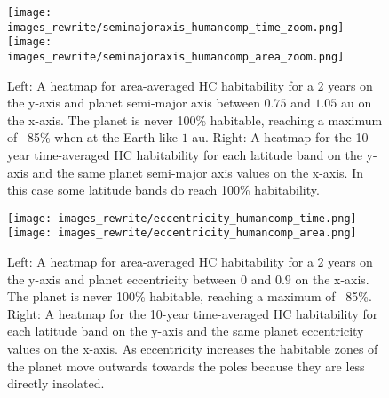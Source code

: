 \documentclass[12pt, onecolumn]{revtex4-2}    %
\begin{document}
\begin{figure}[t]
  \texttt{[image: images\_rewrite/semimajoraxis\_humancomp\_time\_zoom.png]}
  \texttt{[image: images\_rewrite/semimajoraxis\_humancomp\_area\_zoom.png]}
  \caption{
    Left: A heatmap for area-averaged HC habitability for a 2 years on the y-axis and planet semi-major axis between $0.75$ and $1.05$ au on the x-axis.
    The planet is never 100\% habitable, reaching a maximum of ~85\% when at the Earth-like $1$ au.
    Right: A heatmap for the 10-year time-averaged HC habitability for each latitude band on the y-axis and the same planet semi-major axis values on the x-axis.
    In this case some latitude bands do reach 100\% habitability.
  }
  \label{fig:qualitative_semimajoraxis}
\end{figure}

\begin{figure}[t]
  \texttt{[image: images\_rewrite/eccentricity\_humancomp\_time.png]}
  \texttt{[image: images\_rewrite/eccentricity\_humancomp\_area.png]}
  \caption{
    Left: A heatmap for area-averaged HC habitability for a 2 years on the y-axis and planet eccentricity between $0$ and $0.9$ on the x-axis.
    The planet is never 100\% habitable, reaching a maximum of ~85\%.
    Right: A heatmap for the 10-year time-averaged HC habitability for each latitude band on the y-axis and the same planet eccentricity values on the x-axis.
    As eccentricity increases the habitable zones of the planet move outwards towards the poles because they are less directly insolated.
  }
  \label{fig:qualitative_eccentricity}
\end{figure}
\end{document}
